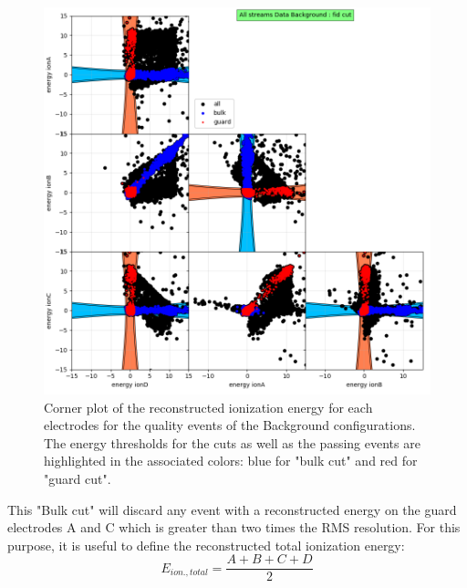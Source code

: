 \begin{figure}
\centering
\includegraphics[width=\linewidth,]{Figures/Neutron/fid_cut.png}
\caption{Corner plot of the reconstructed ionization energy for each electrodes for the quality events of the Background configurations. The energy thresholds for the cuts as well as the passing events are highlighted in the associated colors: blue for "bulk cut" and red for "guard cut".}
\label{fig:fig-cut}
\end{figure}

This "Bulk cut" will discard any event with a reconstructed energy on the guard electrodes A and C which is greater than two times the RMS resolution.
For this purpose, it is useful to define the reconstructed total ionization energy:
\begin{equation}
E_{ion., total} = \frac{A+B+C+D}{2}
\end{equation}



